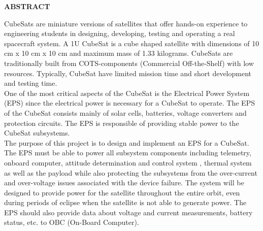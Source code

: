 \thispagestyle{plain}

\begin{center}
	\Large {\bf \uppercase{ABSTRACT}}
\end{center}

\vspace{3\baselineskip}

\justifying
%
%
%

CubeSats are miniature versions of satellites that offer hands-on experience to engineering students in designing, developing, testing and operating a real spacecraft system. A 1U CubeSat is a cube shaped satellite with dimensions of 10 cm x 10 cm x 10 cm and maximum mass of 1.33 kilograms. CubeSats are traditionally built from COTS-components (Commercial Off-the-Shelf) with low resources. Typically, CubeSat have limited mission time and short development and testing time. 
\\
One of the most critical aspects of the CubeSat is the Electrical Power System (EPS) since the electrical power is necessary for a CubeSat to operate. The EPS of the CubeSat consists mainly of solar cells, batteries, voltage converters and protection circuits. The EPS is responsible of providing stable power to the CubeSat subsystems.
\\
The purpose of this project is to design and implement an EPS for a CubeSat. The EPS must be able to power all subsystem components including telemetry, onboard computer, attitude determination and control system , thermal system as well as the payload while also protecting the subsystems from the over-current and over-voltage issues associated with the device failure. The system will be designed to provide power for the satellite throughout the entire orbit, even during periods of eclipse when the satellite is not able to generate power. The EPS should also provide data about voltage and current measurements, battery status, etc. to OBC (On-Board Computer).


